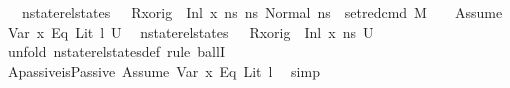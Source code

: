 \begin{isabellebody}
\ \ \ {\isachardoublequoteopen}nstate{\isacharunderscore}{\kern0pt}rel{\isacharunderscore}{\kern0pt}states\ {\isasymLambda}\ {\isasymLambda}{\isacharprime}{\kern0pt}\ {\isacharparenleft}{\kern0pt}R{\isacharparenleft}{\kern0pt}x{\isacharunderscore}{\kern0pt}orig\ {\isasymmapsto}\ {\isacharparenleft}{\kern0pt}Inl\ x{}{\isacharparenright}{\kern0pt}{\isacharparenright}{\kern0pt}{\isacharparenright}{\kern0pt}\ ns\ {\isacharbraceleft}{\kern0pt}ns{\isacharprime}{\kern0pt}{\isachardot}{\kern0pt}\ Normal\ ns{\isacharprime}{\kern0pt}\ {\isasymin}\ {\isacharparenleft}{\kern0pt}set{\isacharunderscore}{\kern0pt}red{\isacharunderscore}{\kern0pt}cmd\ M\ {\isasymLambda}{\isacharprime}{\kern0pt}\ {\isasymGamma}\ {\isasymOmega}\ {\isacharparenleft}{\kern0pt}Assume\ {\isacharparenleft}{\kern0pt}{\isacharparenleft}{\kern0pt}Var\ x{}{\isacharparenright}{\kern0pt}\ {\isasymguillemotleft}Eq{\isasymguillemotright}\ {\isacharparenleft}{\kern0pt}Lit\ l{\isacharparenright}{\kern0pt}{\isacharparenright}{\kern0pt}{\isacharparenright}{\kern0pt}\ U{\isacharparenright}{\kern0pt}{\isacharbraceright}{\kern0pt}{\isachardoublequoteclose}\isanewline
\ {\isacharparenleft}{\kern0pt}\ {\isachardoublequoteopen}nstate{\isacharunderscore}{\kern0pt}rel{\isacharunderscore}{\kern0pt}states\ {\isasymLambda}\ {\isasymLambda}{\isacharprime}{\kern0pt}\ {\isacharparenleft}{\kern0pt}R{\isacharparenleft}{\kern0pt}x{\isacharunderscore}{\kern0pt}orig\ {\isasymmapsto}\ {\isacharparenleft}{\kern0pt}Inl\ x{}{\isacharparenright}{\kern0pt}{\isacharparenright}{\kern0pt}{\isacharparenright}{\kern0pt}\ ns\ {\isacharquery}{\kern0pt}U{\isacharprime}{\kern0pt}{\isachardoublequoteclose}{\isacharparenright}{\kern0pt}\isanewline
%
\isadelimproof
%
\endisadelimproof
%
\isatagproof
{}\isamarkupfalse%
\ {\isacharparenleft}{\kern0pt}unfold\ nstate{\isacharunderscore}{\kern0pt}rel{\isacharunderscore}{\kern0pt}states{\isacharunderscore}{\kern0pt}def{\isacharcomma}{\kern0pt}\ rule\ ballI{\isacharparenright}{\kern0pt}\isanewline
\ \ \isamarkupfalse%
\ Apassive{\isacharcolon}{\kern0pt}{\isachardoublequoteopen}isPassive\ {\isacharparenleft}{\kern0pt}Assume\ {\isacharparenleft}{\kern0pt}{\isacharparenleft}{\kern0pt}Var\ x{}{\isacharparenright}{\kern0pt}\ {\isasymguillemotleft}Eq{\isasymguillemotright}\ {\isacharparenleft}{\kern0pt}Lit\ l{\isacharparenright}{\kern0pt}{\isacharparenright}{\kern0pt}{\isacharparenright}{\kern0pt}{\isachardoublequoteclose}\ \isamarkupfalse%
\ simp\isanewline
\ \ \isamarkupfalse%

\end{isabellebody}
